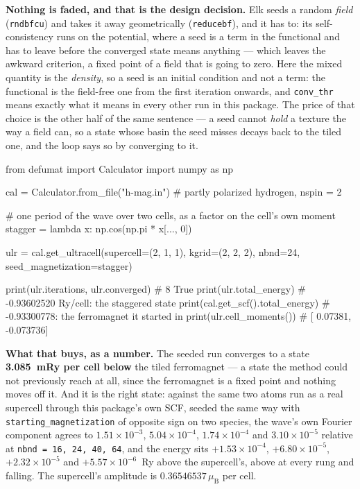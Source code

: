 \documentclass[11pt,a4paper]{article}
\newcommand{\code}[1]{\texttt{\small #1}}
\begin{document}
\textbf{Nothing is faded, and that is the design decision.} Elk seeds a random
\emph{field} (\code{rndbfcu}) and takes it away geometrically
(\code{reducebf}), and it has to: its self-consistency runs on the potential,
where a seed is a term in the functional and has to leave before the converged
state means anything --- which leaves the awkward criterion, a fixed point of a
field that is going to zero. Here the mixed quantity is the \emph{density}, so a
seed is an initial condition and not a term: the functional is the field-free one
from the first iteration onwards, and \code{conv\_thr} means exactly what it
means in every other run in this package. The price of that choice is the other
half of the same sentence --- a seed cannot \emph{hold} a texture the way a field
can, so a state whose basin the seed misses decays back to the tiled one, and the
loop says so by converging to it.

\begin{pycode}
from defumat import Calculator
import numpy as np

cal = Calculator.from_file("h-mag.in")   # partly polarized hydrogen, nspin = 2

# one period of the wave over two cells, as a factor on the cell's own moment
stagger = lambda x: np.cos(np.pi * x[..., 0])

ulr = cal.get_ultracell(supercell=(2, 1, 1), kgrid=(2, 2, 2), nbnd=24,
                        seed_magnetization=stagger)

print(ulr.iterations, ulr.converged)   # 8 True
print(ulr.total_energy)                # -0.93602520 Ry/cell: the staggered state
print(cal.get_scf().total_energy)      # -0.93300778: the ferromagnet it started in
print(ulr.cell_moments())              # [ 0.07381, -0.073736]
\end{pycode}

\textbf{What that buys, as a number.} The seeded run converges to a state
\textbf{3.085~mRy per cell below} the tiled ferromagnet --- a state the method
could not previously reach at all, since the ferromagnet is a fixed point and
nothing moves off it. And it is the right state: against the same two atoms run
as a real supercell through this package's own SCF, seeded the same way with
\code{starting\_magnetization} of opposite sign on two species, the wave's own
Fourier component agrees to $1.51\times10^{-3}$, $5.04\times10^{-4}$,
$1.74\times10^{-4}$ and $3.10\times10^{-5}$ relative at
\code{nbnd = 16, 24, 40, 64}, and the energy sits $+1.53\times10^{-4}$,
$+6.80\times10^{-5}$, $+2.32\times10^{-5}$ and $+5.57\times10^{-6}$~Ry above
the supercell's, above at every rung and falling. The supercell's amplitude is
$0.36546537\,\mu_{\mathrm B}$ per cell.
\end{document}
